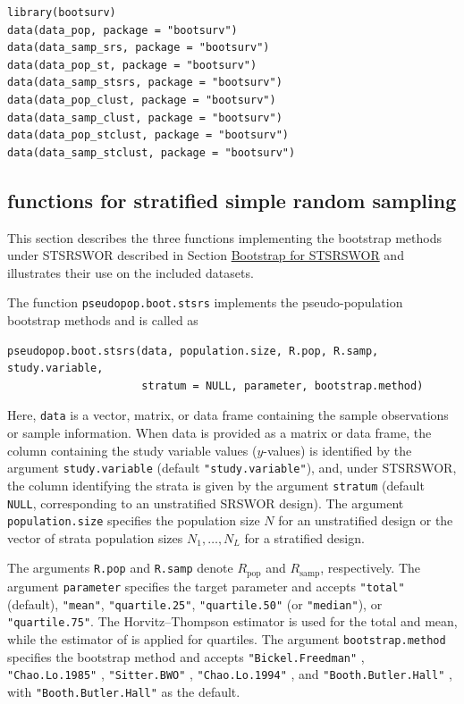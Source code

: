 \begin{verbatim}
library(bootsurv)
data(data_pop, package = "bootsurv")
data(data_samp_srs, package = "bootsurv")
data(data_pop_st, package = "bootsurv")
data(data_samp_stsrs, package = "bootsurv")
data(data_pop_clust, package = "bootsurv")
data(data_samp_clust, package = "bootsurv")
data(data_pop_stclust, package = "bootsurv")
data(data_samp_stclust, package = "bootsurv")
\end{verbatim}

\subsection{\texorpdfstring{ functions for stratified simple random sampling}{ functions for stratified simple random sampling}}\label{sec:pkgbootsurvsrs}

This section describes the three  functions implementing the bootstrap methods under STSRSWOR described in Section \hyperref[Boot_STSRSWOR]{Bootstrap for STSRSWOR} and illustrates their use on the included datasets.

The function \texttt{pseudopop.boot.stsrs} implements the pseudo-population bootstrap methods and is called as

\begin{verbatim}
pseudopop.boot.stsrs(data, population.size, R.pop, R.samp, study.variable,
                     stratum = NULL, parameter, bootstrap.method)
\end{verbatim}

Here, \texttt{data} is a vector, matrix, or data frame containing the sample observations or sample information. When data is provided as a matrix or data frame, the column containing the study variable values (\(y\)-values) is identified by the argument \texttt{study.variable} (default \texttt{"study.variable"}), and, under STSRSWOR, the column identifying the strata is given by the argument \texttt{stratum} (default \texttt{NULL}, corresponding to an unstratified SRSWOR design). The argument \texttt{population.size} specifies the population size \(N\) for an unstratified design or the vector of strata population sizes \(N_1, \ldots, N_L\) for a stratified design.

The arguments \texttt{R.pop} and \texttt{R.samp} denote \(R_{\text{pop}}\) and \(R_{\text{samp}}\), respectively.
The argument \texttt{parameter} specifies the target parameter and accepts \texttt{"total"} (default), \texttt{"mean"}, \texttt{"quartile.25"}, \texttt{"quartile.50"} (or \texttt{"median"}), or \texttt{"quartile.75"}. The Horvitz--Thompson estimator is used for the total and mean, while the estimator of \citet[Chapter 5]{Sarndal:Swensson:Wretman:1992} is applied for quartiles. The argument \texttt{bootstrap.method} specifies the bootstrap method and accepts \texttt{"Bickel.Freedman"} \citep{Bickel:Freedman:1984}, \texttt{"Chao.Lo.1985"} \citep{Chao:Lo:1985}, \texttt{"Sitter.BWO"} \citep{Sitter:1992a}, \texttt{"Chao.Lo.1994"} \citep{Chao:Lo:1994}, and \texttt{"Booth.Butler.Hall"} \citep{Booth:Butler:Hall:1994}, with \texttt{"Booth.Butler.Hall"} as the default.

